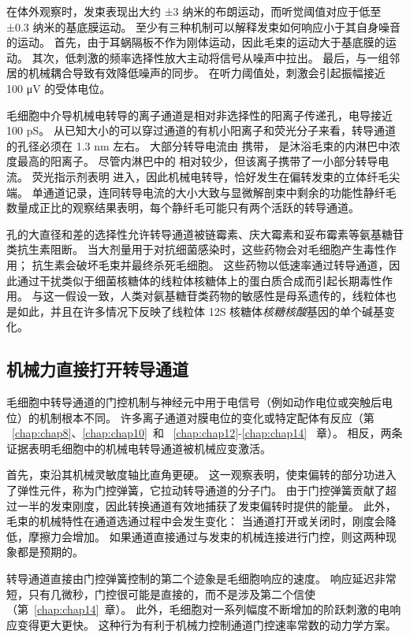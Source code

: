 在体外观察时，发束表现出大约 ±3 纳米的布朗运动，而听觉阈值对应于低至 ±0.3 纳米的基底膜运动。
至少有三种机制可以解释发束如何响应小于其自身噪音的运动。
首先，由于耳蜗隔板不作为刚体运动，因此毛束的运动大于基底膜的运动。
其次，低刺激的频率选择性放大主动将信号从噪声中拉出。
最后，与一组邻居的机械耦合导致有效降低噪声的同步。 
在听力阈值处，刺激会引起振幅接近 100 μV 的受体电位。


毛细胞中介导机械电转导的离子通道是相对非选择性的阳离子传递孔，电导接近 100 pS。
从已知大小的可以穿过通道的有机小阳离子和荧光分子来看，转导通道的孔径必须在 1.3 nm 左右。
大部分转导电流由  携带， 是沐浴毛束的内淋巴中浓度最高的阳离子。
尽管内淋巴中的  相对较少，但该离子携带了一小部分转导电流。
荧光指示剂表明  进入，因此机械电转导，恰好发生在偏转发束的立体纤毛尖端。
单通道记录，连同转导电流的大小大致与显微解剖束中剩余的功能性静纤毛数量成正比的观察结果表明，每个静纤毛可能只有两个活跃的转导通道。


孔的大直径和差的选择性允许转导通道被链霉素、庆大霉素和妥布霉素等氨基糖苷类抗生素阻断。
当大剂量用于对抗细菌感染时，这些药物会对毛细胞产生毒性作用；
抗生素会破坏毛束并最终杀死毛细胞。
这些药物以低速率通过转导通道，因此通过干扰类似于细菌核糖体的线粒体核糖体上的蛋白质合成而引起长期毒性作用。
与这一假设一致，人类对氨基糖苷类药物的敏感性是母系遗传的，线粒体也是如此，并且在许多情况下反映了线粒体 12S 核糖体\textit{核糖核酸}基因的单个碱基变化。



\subsection{机械力直接打开转导通道}

毛细胞中转导通道的门控机制与神经元中用于电信号（例如动作电位或突触后电位）的机制根本不同。
许多离子通道对膜电位的变化或特定配体有反应（第 ~\ref{chap:chap8}、\ref{chap:chap10}~和 ~\ref{chap:chap12}-\ref{chap:chap14}~ 章）。
相反，两条证据表明毛细胞中的机械电转导通道被机械应变激活。


首先，束沿其机械灵敏度轴比直角更硬。
这一观察表明，使束偏转的部分功进入了弹性元件，称为门控弹簧，它拉动转导通道的分子门。
由于门控弹簧贡献了超过一半的发束刚度，因此转换通道有效地捕获了发束偏转时提供的能量。
此外，毛束的机械特性在通道选通过程中会发生变化：
当通道打开或关闭时，刚度会降低，摩擦力会增加。
如果通道直接通过与发束的机械连接进行门控，则这两种现象都是预期的。


转导通道直接由门控弹簧控制的第二个迹象是毛细胞响应的速度。
响应延迟非常短，只有几微秒，门控很可能是直接的，而不是涉及第二个信使（第~\ref{chap:chap14}~章）。
此外，毛细胞对一系列幅度不断增加的阶跃刺激的电响应变得更大更快。
这种行为有利于机械力控制通道门控速率常数的动力学方案。


